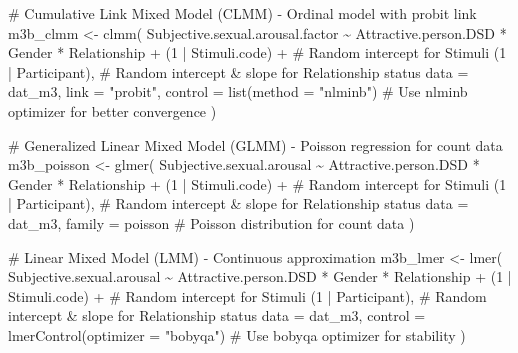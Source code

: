 \documentclass[
  bookmarksnumbered]{article}
\newenvironment{Shaded}{\begin{snugshade}}{\end{snugshade}}
\newcommand{\AttributeTok}[1]{\textcolor[rgb]{0.80,0.80,0.80}{#1}}
\newcommand{\CommentTok}[1]{\textcolor[rgb]{0.50,0.62,0.50}{#1}}
\newcommand{\DecValTok}[1]{\textcolor[rgb]{0.86,0.86,0.80}{#1}}
\newcommand{\FunctionTok}[1]{\textcolor[rgb]{0.94,0.94,0.56}{#1}}
\newcommand{\NormalTok}[1]{\textcolor[rgb]{0.80,0.80,0.80}{#1}}
\newcommand{\OtherTok}[1]{\textcolor[rgb]{0.94,0.94,0.56}{#1}}
\newcommand{\SpecialCharTok}[1]{\textcolor[rgb]{0.86,0.64,0.64}{#1}}
\newcommand{\StringTok}[1]{\textcolor[rgb]{0.80,0.58,0.58}{#1}}
\begin{document}
\begin{Shaded}
\begin{Highlighting}[]
\CommentTok{\# Cumulative Link Mixed Model (CLMM) {-} Ordinal model with probit link}
\NormalTok{m3b\_clmm }\OtherTok{\textless{}{-}} \FunctionTok{clmm}\NormalTok{(}
\NormalTok{  Subjective.sexual.arousal.factor }\SpecialCharTok{\textasciitilde{}}\NormalTok{ Attractive.person.DSD }\SpecialCharTok{*}\NormalTok{ Gender }\SpecialCharTok{*}\NormalTok{ Relationship }\SpecialCharTok{+}
\NormalTok{    (}\DecValTok{1} \SpecialCharTok{|}\NormalTok{ Stimuli.code) }\SpecialCharTok{+} \CommentTok{\# Random intercept for Stimuli}
\NormalTok{    (}\DecValTok{1} \SpecialCharTok{|}\NormalTok{ Participant), }\CommentTok{\# Random intercept \& slope for Relationship status}
  \AttributeTok{data =}\NormalTok{ dat\_m3,}
  \AttributeTok{link =} \StringTok{"probit"}\NormalTok{,}
  \AttributeTok{control =} \FunctionTok{list}\NormalTok{(}\AttributeTok{method =} \StringTok{"nlminb"}\NormalTok{) }\CommentTok{\# Use \textquotesingle{}nlminb\textquotesingle{} optimizer for better convergence}
\NormalTok{)}

\CommentTok{\# Generalized Linear Mixed Model (GLMM) {-} Poisson regression for count data}
\NormalTok{m3b\_poisson }\OtherTok{\textless{}{-}} \FunctionTok{glmer}\NormalTok{(}
\NormalTok{  Subjective.sexual.arousal }\SpecialCharTok{\textasciitilde{}}\NormalTok{ Attractive.person.DSD }\SpecialCharTok{*}\NormalTok{ Gender }\SpecialCharTok{*}\NormalTok{ Relationship }\SpecialCharTok{+}
\NormalTok{    (}\DecValTok{1} \SpecialCharTok{|}\NormalTok{ Stimuli.code) }\SpecialCharTok{+} \CommentTok{\# Random intercept for Stimuli}
\NormalTok{    (}\DecValTok{1} \SpecialCharTok{|}\NormalTok{ Participant), }\CommentTok{\# Random intercept \& slope for Relationship status}
  \AttributeTok{data =}\NormalTok{ dat\_m3,}
  \AttributeTok{family =}\NormalTok{ poisson }\CommentTok{\# Poisson distribution for count data}
\NormalTok{)}

\CommentTok{\# Linear Mixed Model (LMM) {-} Continuous approximation}
\NormalTok{m3b\_lmer }\OtherTok{\textless{}{-}} \FunctionTok{lmer}\NormalTok{(}
\NormalTok{  Subjective.sexual.arousal }\SpecialCharTok{\textasciitilde{}}\NormalTok{ Attractive.person.DSD }\SpecialCharTok{*}\NormalTok{ Gender }\SpecialCharTok{*}\NormalTok{ Relationship }\SpecialCharTok{+}
\NormalTok{    (}\DecValTok{1} \SpecialCharTok{|}\NormalTok{ Stimuli.code) }\SpecialCharTok{+} \CommentTok{\# Random intercept for Stimuli}
\NormalTok{    (}\DecValTok{1} \SpecialCharTok{|}\NormalTok{ Participant), }\CommentTok{\# Random intercept \& slope for Relationship status}
  \AttributeTok{data =}\NormalTok{ dat\_m3,}
  \AttributeTok{control =} \FunctionTok{lmerControl}\NormalTok{(}\AttributeTok{optimizer =} \StringTok{"bobyqa"}\NormalTok{) }\CommentTok{\# Use \textquotesingle{}bobyqa\textquotesingle{} optimizer for stability}
\NormalTok{)}
\end{Highlighting}
\end{Shaded}
\end{document}

